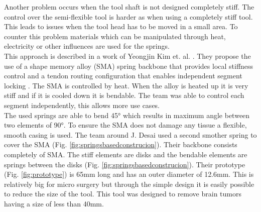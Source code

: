 Another problem occurs when the tool shaft is not designed completely stiff. The control over the semi-flexible tool is harder as when using a completely stiff tool. This leads to issues when the tool head has to be moved in a small area. To counter this problem materials  which can be manipulated through heat, electricity or other influences are used for the springs. \\
This approach is described in a work of Yeongjin Kim et. al. \cite{StiffnessTuning}. They propose the use of a \grqq shape memory alloy (SMA) spring backbone that provides local stiffness control and a tendon routing configuration that enables independent segment locking \grqq \cite{StiffnessTuning}. The SMA is controlled by heat. When the alloy is heated up it is very stiff and if it is cooled down it is bendable. The team was able to control each segment independently, this allows more use cases. \\
The used springs are able to bend 45° which results in maximum angle between two elements of 90°. To ensure the SMA does not damage any tissue a flexible, smooth casing is used. The team around J. Desai used a second smother spring to cover the SMA (Fig. \ref{fig:springsbasedconstrucion}). Their backbone  consists completely of SMA. The stiff elements are disks and the bendable elements are springs between the disks (Fig. \ref{fig:springsbasedconstrucion}). Their prototype (Fig. \ref{fig:prototype}) is 65mm long and has an outer diameter of 12.6mm. This is relatively big for micro surgery but through the simple design it is easily possible to reduce the size of the tool. This tool was designed to remove brain tumors having a size of less than 40mm.
